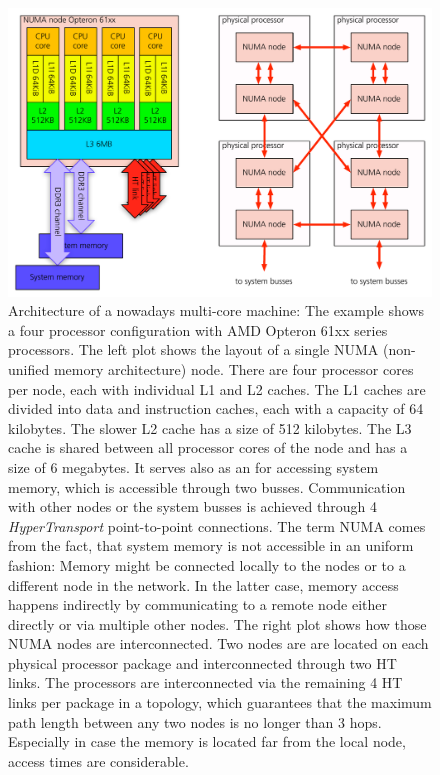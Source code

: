\begin{figure}[htbp]
\begin{center}
\includegraphics[scale=0.6]{26algo_magnycours.pdf}
\caption{Architecture of a nowadays multi-core machine: The example shows a four processor configuration with AMD Opteron 61xx series processors. The left plot shows the layout of a single NUMA (non-unified memory architecture) node. There are four processor cores per node, each with individual L1 and L2 caches. The L1 caches are divided into data and instruction caches, each with a capacity of 64 kilobytes. The slower L2 cache has a size of 512 kilobytes. The L3 cache is shared between all processor cores of the node and has a size of 6 megabytes. It serves also as an for accessing system memory, which is accessible through two busses. Communication with other nodes or the system busses is achieved through 4 \emph{HyperTransport} point-to-point connections. The term NUMA comes from the fact, that system memory is not accessible in an uniform fashion: Memory might be connected locally to the nodes or to a different node in the network. In the latter case, memory access happens indirectly by communicating to a remote node either directly or via multiple other nodes. The right plot shows how those NUMA nodes are interconnected. Two nodes are are located on each physical processor package and interconnected through two HT links. The processors are interconnected via the remaining 4 HT links per package in a topology, which guarantees that the maximum path length between any two nodes is no longer than 3 hops. Especially in case the memory is located far from the local node, access times are considerable.}
\label{ch02_fig26}
\end{center}
\end{figure}

